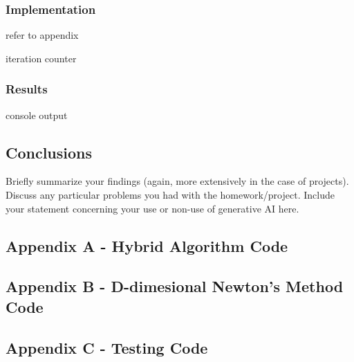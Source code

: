 \documentclass[10pt]{article}
\begin{document}
\subsubsection*{Implementation}

refer to appendix 

iteration counter

\subsubsection*{Results}

console output

\pagebreak

\subsection*{Conclusions}
Briefly summarize your findings (again, more extensively in the case of projects).
Discuss any particular problems you had with the homework/project.
Include your statement concerning your use or non-use of generative AI here.

\pagebreak

\subsection*{Appendix A - Hybrid Algorithm Code}


\pagebreak

\subsection*{Appendix B - D-dimesional Newton's Method Code}


\pagebreak

\subsection*{Appendix C - Testing Code}

\end{document}
